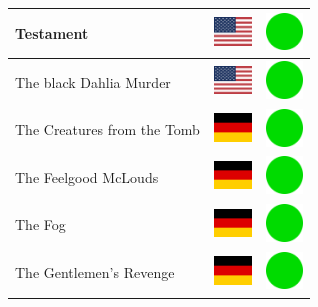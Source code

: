 \documentclass[12pt, a4paper, twoside]{report}
\begin{document}
\begin{center}
\begin{longtable}{|p{5cm}|p{2cm}|p{2cm}|}
 Testament                                                  & \includegraphics[width=1cm]{4x3/us} &   \includegraphics[width=1cm]{likes/y} \\ \hline
 The black Dahlia Murder                                    & \includegraphics[width=1cm]{4x3/us} &   \includegraphics[width=1cm]{likes/y} \\ \hline
 The Creatures from the Tomb                                & \includegraphics[width=1cm]{4x3/de} &   \includegraphics[width=1cm]{likes/y} \\ \hline
 The Feelgood McLouds                                       & \includegraphics[width=1cm]{4x3/de} &   \includegraphics[width=1cm]{likes/y} \\ \hline
 The Fog                                                    & \includegraphics[width=1cm]{4x3/de} &   \includegraphics[width=1cm]{likes/y} \\ \hline
 The Gentlemen's Revenge                                    & \includegraphics[width=1cm]{4x3/de} &   \includegraphics[width=1cm]{likes/y} \\ \hline

\end{longtable}
\end{center}
\end{document}
